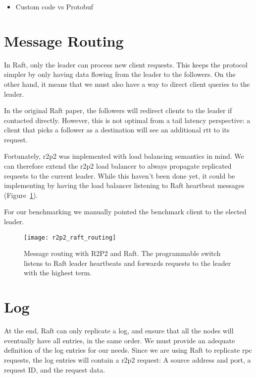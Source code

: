 
\begin{itemize}
    \item Custom code vs Protobuf
\end{itemize}



\section{Message Routing}
\label{sec:message_routing}

In Raft, only the leader can process new client requests.
This keeps the protocol simpler by only having data flowing from the leader to the followers.
On the other hand, it means that we must also have a way to direct client queries to the leader.

In the original Raft paper\cite{raft}, the followers will redirect clients to the leader if contacted directly.
However, this is not optimal from a tail latency perspective: a client that picks a follower as a destination will see an additional \gls{rtt} to its request.

Fortunately, \gls{r2p2} was implemented with load balancing semantics in mind.
We can therefore extend the \gls{r2p2} load balancer to always propagate replicated requests to the current leader.
While this haven't been done yet, it could be implementing by having the load balancer listening to Raft heartbeat messages (Figure~\ref{fig:r2p2_raft_routing}).

For our benchmarking we manually pointed the benchmark client to the elected leader.


\begin{figure}[h]
    \centering
    \texttt{[image: r2p2\_raft\_routing]}
    \caption{Message routing with R2P2 and Raft.
        The programmable switch listens to Raft leader heartbeats and forwards requests to the leader with the highest term.
    \label{fig:r2p2_raft_routing}
    }
\end{figure}

\section{Log}

At the end, Raft can only replicate a log, and ensure that all the nodes will eventually have all entries, in the same order.
We must provide an adequate definition of the log entries for our needs.
Since we are using Raft to replicate \gls{rpc} requests, the log entries will contain a \gls{r2p2} request: A source address and port, a request ID, and the request data.

